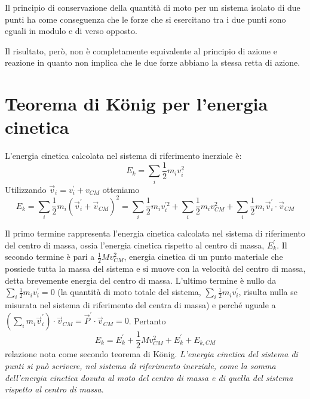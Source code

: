 \documentclass[class=book, crop=false, oneside, 12pt]{standalone}
\begin{document}
Il principio di conservazione della quantità di moto per un sistema isolato di due punti ha come conseguenza che le forze che si esercitano tra i due punti sono eguali in modulo e di verso opposto.

Il risultato, però, non è completamente equivalente al principio di azione e reazione in quanto non implica che le due forze abbiano la stessa retta di azione.


\section{Teorema di König per l'energia cinetica}
L'energia cinetica calcolata nel sistema di riferimento inerziale è:
\begin{equation*}
    E_k = \sum_i \frac{1}{2} m_i v_i^2
\end{equation*}
Utilizzando \(\overrightarrow{v}_i = v_i^{\prime} + v_{CM}\) otteniamo
\begin{equation*}
    E_k = \sum_i \frac{1}{2} m_i \left(\overrightarrow{v}_i^{\prime} + \overrightarrow{v}_{CM}\right)^2 = \sum_i \frac{1}{2} m_i v_i^{\prime 2} + \sum_i \frac{1}{2} m_i v_{CM}^{2} + \sum_i \frac{1}{2} m_i \overrightarrow{v}_i^{\prime} \cdot \overrightarrow{v}_{CM}
\end{equation*}

Il primo termine rappresenta l'energia cinetica calcolata nel sistema di riferimento del centro di massa, ossia l'energia cinetica rispetto al centro di massa, \(E_k^{\prime}\). Il secondo termine è pari a \(\frac{1}{2} M v_{CM}^2\), energia cinetica di un punto materiale che possiede tutta la massa del sistema e si muove con la velocità del centro di massa, detta brevemente energia del centro di massa. 
L'ultimo termine è nullo da \(\sum_i \frac{1}{2} m_i v_i^{\prime} = 0\) (la quantità di moto totale del sistema, \(\sum_i \frac{1}{2} m_i v_i^{\prime}\), risulta nulla se misurata nel sistema di riferimento del centra di massa) e perché uguale a \(\left(\sum_i m_i \overrightarrow{v}_i^{\prime}\right) \cdot \overrightarrow{v}_{CM} = \overrightarrow{P}^{\prime} \cdot \overrightarrow{v}_{CM} = 0\). Pertanto 
\begin{equation} \label{thm_konig}
    E_k = E_k^{\prime} + \frac{1}{2} M v_{CM}^2 + E_k^{\prime} + E_{k,CM} 
\end{equation}
relazione nota come secondo teorema di König. 
\emph{L'energia cinetica del sistema di punti si può scrivere, nel sistema di riferimento inerziale, come la somma dell'energia cinetica dovuta al moto del centro di massa e di quella del sistema rispetto al centro di massa}.
\end{document}
